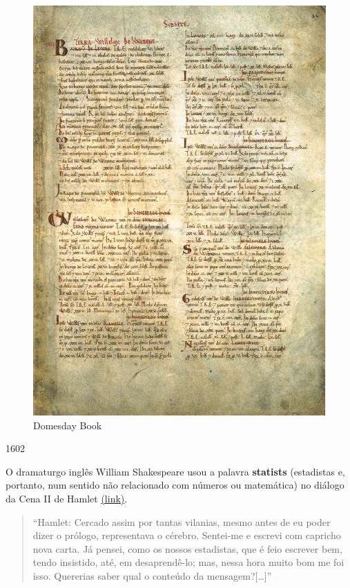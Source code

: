 \documentclass[
]{book}
\begin{document}
\begin{figure}

{\centering \includegraphics[width=0.75\linewidth]{images1/domesday} 

}

\caption{Domesday Book}\label{fig:unnamed-chunk-3}
\end{figure}

\hfill\break

1602

\hfill\break

O dramaturgo inglês William Shakespeare usou a palavra \textbf{statists} (estadistas e, portanto, num sentido não relacionado com números ou matemática) no diálogo da Cena II de Hamlet \href{http://shakespeare.mit.edu/hamlet/full.html}{(link)}.

\hfill\break

\begin{quote}
``Hamlet:
Cercado assim por tantas vilanias, mesmo antes de eu poder dizer o prólogo, representava o cérebro.
Sentei-me e escrevi com capricho nova carta. Já pensei, como os nossos estadistas, que é feio escrever bem, tendo insistido, até, em desaprendê-lo; mas, nessa hora muito bom me foi isso. Quererias saber
qual o conteúdo da mensagem?{[}\ldots{]}''
\end{quote}
\end{document}
